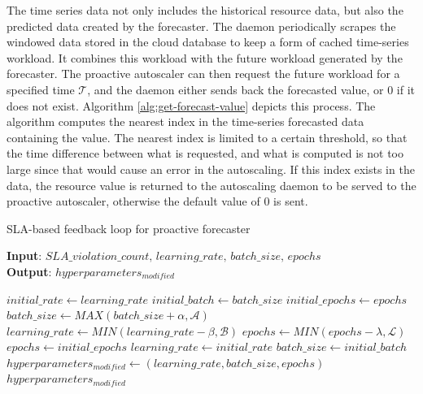 The time series data not only includes the historical resource data, but also the predicted data created by the forecaster. The daemon periodically scrapes the windowed data stored in the cloud database to keep a form of cached time-series workload. It combines this workload with the future workload generated by the forecaster. The proactive autoscaler can then request the future workload for a specified time $\mathcal{T}$, and the daemon either sends back the forecasted value, or $0$ if it does not exist. Algorithm \ref{alg:get-forecast-value} depicts this process. The algorithm computes the nearest index in the time-series forecasted data containing the value. The nearest index is limited to a certain threshold, so that the time difference between what is requested, and what is computed is not too large since that would cause an error in the autoscaling. If this index exists in the data, the resource value is returned to the autoscaling daemon to be served to the proactive autoscaler, otherwise the default value of $0$ is sent.

\begin{algorithm}
    \caption{SLA-based feedback loop for proactive forecaster}
    \label{alg:sla-heuristic-feedback}
    \textbf{Input}: $SLA\_violation\_count,\,learning\_rate,\,batch\_size,\,epochs$\\
    \textbf{Output}: $hyperparameters_{modified}$
    \begin{algorithmic}
        \State $initial\_rate \gets learning\_rate$
        \State $initial\_batch \gets batch\_size$
        \State $initial\_epochs \gets epochs$
            \State $batch\_size \gets MAX(batch\_size + \alpha, \mathcal{A})$
            \State $learning\_rate \gets MIN(learning\_rate - \beta, \mathcal{B})$
            \State $epochs \gets MIN(epochs - \lambda, \mathcal{L})$
        \Else
            \State $epochs \gets initial\_epochs$
            \State $learning\_rate \gets initial\_rate$
            \State $batch\_size \gets initial\_batch$
        \EndIf
        \State $hyperparameters_{modified} \gets (learning\_rate, batch\_size, epochs)$
        \State \Return $hyperparameters_{modified}$
    \end{algorithmic}
\end{algorithm}

